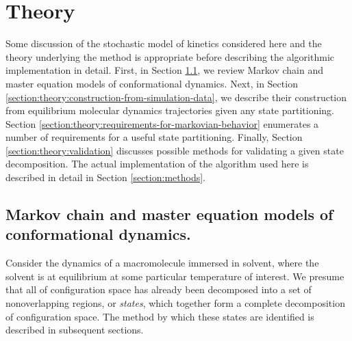 \section{Theory}
\label{section:theory}


Some discussion of the stochastic model of kinetics considered here and the theory underlying the method is appropriate before describing the algorithmic implementation in detail.
First, in Section \ref{section:theory:markov-model-introduction}, we review Markov chain and master equation models of conformational dynamics.
Next, in Section \ref{section:theory:construction-from-simulation-data}, we describe their construction from equilibrium molecular dynamics trajectories given any state partitioning.
Section \ref{section:theory:requirements-for-markovian-behavior} enumerates a number of requirements for a useful state partitioning.
Finally, Section \ref{section:theory:validation} discusses possible methods for validating a given state decomposition.
The actual implementation of the algorithm used here is described in detail in Section \ref{section:methods}.

\subsection{Markov chain and master equation models of conformational dynamics.}
\label{section:theory:markov-model-introduction}

Consider the dynamics of a macromolecule immersed in solvent, where the solvent is at equilibrium at some particular temperature of interest.
We presume that all of configuration space has already been decomposed into a set of nonoverlapping regions, or \emph{states}, which together form a complete decomposition of configuration space.
The method by which these states are identified is described in subsequent sections.

